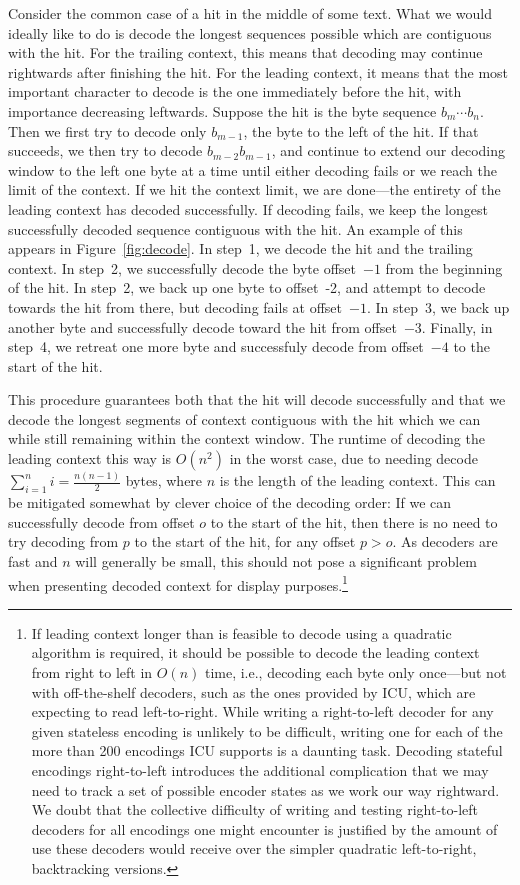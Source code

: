 \documentclass[5p,final,number,sort&compress]{elsarticle}
\begin{document}
Consider the common case of a hit in the middle of some text. What we would ideally like to do is decode the longest sequences possible which are contiguous with the hit. For the trailing context, this means that decoding may continue rightwards after finishing the hit. For the leading context, it means that the most important character to decode is the one immediately before the hit, with importance decreasing leftwards. Suppose the hit is the byte sequence $b_m\dotsb b_n$. Then we first try to decode only $b_{m-1}$, the byte to the left of the hit. If that succeeds, we then try to decode $b_{m-2}b_{m-1}$, and continue to extend our decoding window to the left one byte at a time until either decoding fails or we reach the limit of the context. If we hit the context limit, we are done---the entirety of the leading context has decoded successfully. If decoding fails, we keep the longest successfully decoded sequence contiguous with the hit. An example of this appears in Figure~\ref{fig:decode}. In step~1, we decode the hit and the trailing context. In step~2, we successfully decode the byte offset~$-1$ from the beginning of the hit. In step~2, we back up one byte to offset~-2, and attempt to decode towards the hit from there, but decoding fails at offset~$-1$. In step~3, we back up another byte and successfully decode toward the hit from offset~$-3$. Finally, in step~4, we retreat one more byte and successfuly decode from offset~$-4$ to the start of the hit.

This procedure guarantees both that the hit will decode successfully and that we decode the longest segments of context contiguous with the hit which we can while still remaining within the context window. The runtime of decoding the leading context this way is $O(n^2)$ in the worst case, due to needing decode $\sum^n_{i=1} i = \frac{n(n-1)}{2}$ bytes, where $n$ is the length of the leading context. This can be mitigated somewhat by clever choice of the decoding order: If we can successfully decode from offset $o$ to the start of the hit, then there is no need to try decoding from $p$ to the start of the hit, for any offset $p > o$. As decoders are fast and $n$ will generally be small, this should not pose a significant problem when presenting decoded context for display purposes.\footnote{If leading context longer than is feasible to decode using a quadratic algorithm is required, it should be possible to decode the leading context from right to left in $O(n)$ time, i.e., decoding each byte only once---but not with off-the-shelf decoders, such as the ones provided by ICU, which are expecting to read left-to-right. While writing a right-to-left decoder for any given stateless encoding is unlikely to be difficult, writing one for each of the more than 200 encodings ICU supports is a daunting task. Decoding stateful encodings right-to-left introduces the additional complication that we may need to track a set of possible encoder states as we work our way rightward. We doubt that the collective difficulty of writing and testing right-to-left decoders for all encodings one might encounter is justified by the amount of use these decoders would receive over the simpler quadratic left-to-right, backtracking versions.}
\end{document}
